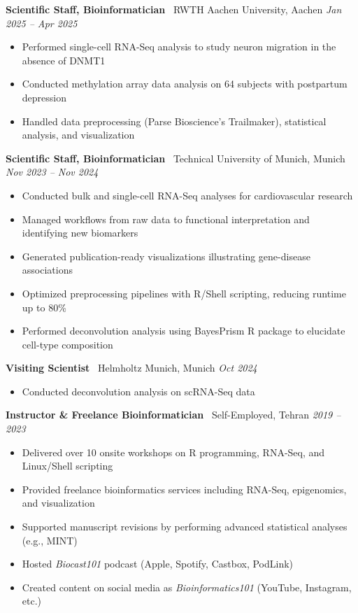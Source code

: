 \documentclass[10pt, a4paper]{article}
\newcommand{\cventry}[4]{%
  \noindent
  \textbf{#2} \textbar\ #3, #4 \hfill \textit{#1}\par\vspace{0pt}
}
\begin{document}
\vspace{1pt}

\cventry{Jan 2025 -- Apr 2025}
  {Scientific Staff, Bioinformatician}
  {RWTH Aachen University}
  {Aachen}
\begin{itemize}
  \item Performed single-cell RNA-Seq analysis to study neuron migration in the absence of DNMT1
  \item Conducted methylation array data analysis on 64 subjects with postpartum depression
  \item Handled data preprocessing (Parse Bioscience's Trailmaker), statistical analysis, and visualization
\end{itemize}

\vspace{1pt}

\cventry{Nov 2023 -- Nov 2024}
  {Scientific Staff, Bioinformatician}
  {Technical University of Munich}
  {Munich}
\begin{itemize}
  \item Conducted bulk and single-cell RNA-Seq analyses for cardiovascular research
  \item Managed workflows from raw data to functional interpretation and identifying new biomarkers
  \item Generated publication-ready visualizations illustrating gene-disease associations
  \item Optimized preprocessing pipelines with R/Shell scripting, reducing runtime up to 80\%
  \item Performed deconvolution analysis using BayesPrism R package to elucidate cell-type composition
\end{itemize}

\vspace{1pt}

\cventry{Oct 2024}
  {Visiting Scientist}
  {Helmholtz Munich}
  {Munich}
\begin{itemize}
  \item Conducted deconvolution analysis on scRNA-Seq data
\end{itemize}

\vspace{1pt}

\cventry{2019 -- 2023}
  {Instructor \& Freelance Bioinformatician}
  {Self-Employed}
  {Tehran}
\begin{itemize}
  \item Delivered over 10 onsite workshops on R programming, RNA-Seq, and Linux/Shell scripting
  \item Provided freelance bioinformatics services including RNA-Seq, epigenomics, and visualization
  \item Supported manuscript revisions by performing advanced statistical analyses (e.g., MINT)
  \item Hosted \textit{Biocast101} podcast (Apple, Spotify, Castbox, PodLink)
  \item Created content on social media as \textit{Bioinformatics101} (YouTube, Instagram, etc.)
\end{itemize}
\end{document}
